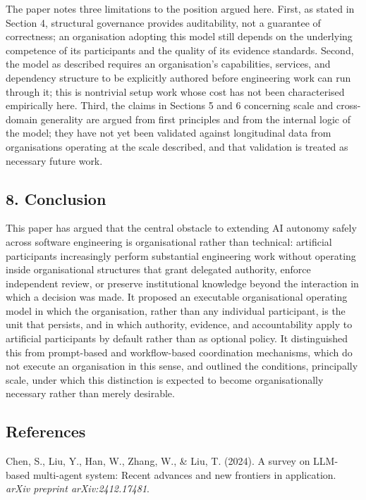 \documentclass[
]{article}
\begin{document}
The paper notes three limitations to the position argued here. First, as
stated in Section 4, structural governance provides auditability, not a
guarantee of correctness; an organisation adopting this model still
depends on the underlying competence of its participants and the quality
of its evidence standards. Second, the model as described requires an
organisation's capabilities, services, and dependency structure to be
explicitly authored before engineering work can run through it; this is
nontrivial setup work whose cost has not been characterised empirically
here. Third, the claims in Sections 5 and 6 concerning scale and
cross-domain generality are argued from first principles and from the
internal logic of the model; they have not yet been validated against
longitudinal data from organisations operating at the scale described,
and that validation is treated as necessary future work.

\hypertarget{conclusion}{%
\subsection{8. Conclusion}\label{conclusion}}

This paper has argued that the central obstacle to extending AI autonomy
safely across software engineering is organisational rather than
technical: artificial participants increasingly perform substantial
engineering work without operating inside organisational structures that
grant delegated authority, enforce independent review, or preserve
institutional knowledge beyond the interaction in which a decision was
made. It proposed an executable organisational operating model in which
the organisation, rather than any individual participant, is the unit
that persists, and in which authority, evidence, and accountability
apply to artificial participants by default rather than as optional
policy. It distinguished this from prompt-based and workflow-based
coordination mechanisms, which do not execute an organisation in this
sense, and outlined the conditions, principally scale, under which this
distinction is expected to become organisationally necessary rather than
merely desirable.

\hypertarget{references}{%
\subsection{References}\label{references}}

Chen, S., Liu, Y., Han, W., Zhang, W., \& Liu, T. (2024). A survey on
LLM-based multi-agent system: Recent advances and new frontiers in
application. \emph{arXiv preprint arXiv:2412.17481}.
\end{document}
